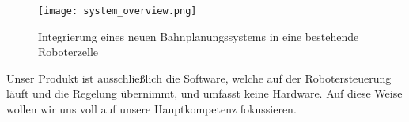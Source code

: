 \begin{figure}[h]
	\centering
	\texttt{[image: system\_overview.png]}
	\caption{Integrierung eines neuen Bahnplanungssystems in eine bestehende Roboterzelle}
	\label{fig:IntegrationBahnplanungssystem}
\end{figure}

Unser Produkt ist ausschließlich die Software, welche auf der Robotersteuerung läuft und die Regelung übernimmt, und umfasst keine Hardware. Auf diese Weise wollen wir uns voll auf unsere Hauptkompetenz fokussieren. 
